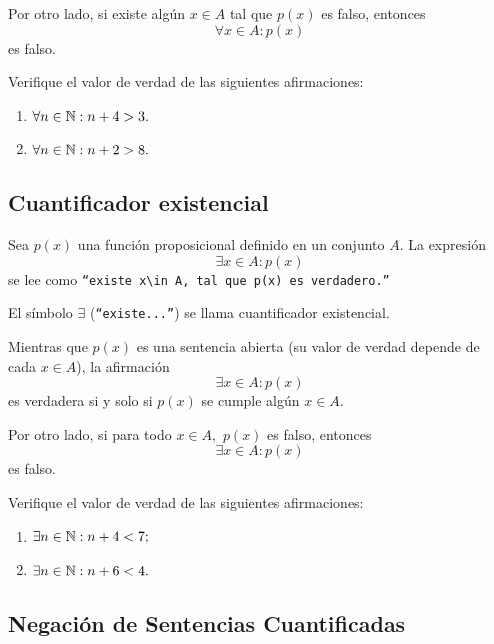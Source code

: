  Por otro lado, si existe alg\'un $x\in A$ tal que $p(x)$ es falso, entonces $$\forall x\in A: p(x)$$ es falso.



 \begin{exmp}
  \label{lip:exmp:4.8}
  Verifique el valor de verdad de las siguientes afirmaciones:
  \begin{enumerate}
   \item $\forall n \in \mathbb{N}: n+4>3.$ 
   \item $\forall n \in \mathbb{N}: n+2>8.$
  \end{enumerate}

 \end{exmp}



\subsection{Cuantificador existencial}


 Sea $p(x)$ una funci\'on proposicional definido en un conjunto $A.$ La expresi\'on
 \begin{equation}
 \label{lip:4.3}
   \exists x \in A: p(x)
 \end{equation} 
 se lee como  \texttt{``existe $x\in A,$ tal que $p(x)$ es verdadero.''}  
 
 El s\'imbolo $\exists$ (\texttt{``existe...''}) se llama cuantificador existencial.




 Mientras que $p(x)$ es una sentencia abierta (su valor de verdad depende de cada $x\in A$), la afirmaci\'on 
 $$\exists x\in A: p(x)$$ es verdadera si y solo si $p(x)$ se cumple alg\'un $x\in A.$  



 Por otro lado, si para todo $x\in A,$ $p(x)$ es falso, entonces $$\exists x\in A: p(x)$$ es falso.



 Verifique el valor de verdad de las siguientes afirmaciones:
 \begin{enumerate}
  \item $\exists n  \in \mathbb{N}: n+4<7;$ 
  \item $\exists n \in \mathbb{N}: n+6<4.$
 \end{enumerate}



\subsection{Negaci\'on de Sentencias Cuantificadas}



